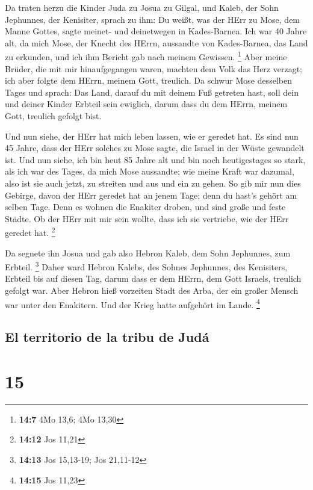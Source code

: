  Da traten herzu die Kinder Juda zu Josua zu Gilgal, und
Kaleb, der Sohn Jephunnes, der Kenisiter, sprach zu ihm: Du weißt, was
der HErr zu Mose, dem Manne Gottes, sagte meinet- und deinetwegen in
Kades-Barnea.  Ich war 40 Jahre alt, da mich Mose, der
Knecht des HErrn, aussandte von Kades-Barnea, das Land zu erkunden, und
ich ihm Bericht gab nach meinem Gewissen. \footnote{\textbf{14:7} 4Mo
  13,6; 4Mo 13,30}  Aber meine Brüder, die mit mir
hinaufgegangen waren, machten dem Volk das Herz verzagt; ich aber folgte
dem HErrn, meinem Gott, treulich.  Da schwur Mose
desselben Tages und sprach: Das Land, darauf du mit deinem Fuß getreten
hast, soll dein und deiner Kinder Erbteil sein ewiglich, darum dass du
dem HErrn, meinem Gott, treulich gefolgt bist.

 Und nun siehe, der HErr hat mich leben lassen, wie er
geredet hat. Es sind nun 45 Jahre, dass der HErr solches zu Mose sagte,
die Israel in der Wüste gewandelt ist. Und nun siehe, ich bin heut 85
Jahre alt  und bin noch heutigestages so stark, als ich
war des Tages, da mich Mose aussandte; wie meine Kraft war dazumal, also
ist sie auch jetzt, zu streiten und aus und ein zu gehen.
 So gib mir nun dies Gebirge, davon der HErr geredet hat
an jenem Tage; denn du hast's gehört am selben Tage. Denn es wohnen die
Enakiter droben, und sind große und feste Städte. Ob der HErr mit mir
sein wollte, dass ich sie vertriebe, wie der HErr geredet hat.
\footnote{\textbf{14:12} Jos 11,21}

 Da segnete ihn Josua und gab also Hebron Kaleb, dem Sohn
Jephunnes, zum Erbteil. \footnote{\textbf{14:13} Jos 15,13-19; Jos
  21,11-12}  Daher ward Hebron Kalebs, des Sohnes
Jephunnes, des Kenisiters, Erbteil bis auf diesen Tag, darum dass er dem
HErrn, dem Gott Israels, treulich gefolgt war.  Aber
Hebron hieß vorzeiten Stadt des Arba, der ein großer Mensch war unter
den Enakitern. Und der Krieg hatte aufgehört im Lande. \footnote{\textbf{14:15}
  Jos 11,23}

\hypertarget{el-territorio-de-la-tribu-de-juduxe1}{%
\subsection{El territorio de la tribu de
Judá}\label{el-territorio-de-la-tribu-de-juduxe1}}

\hypertarget{section-14}{%
\section{15}\label{section-14}}

